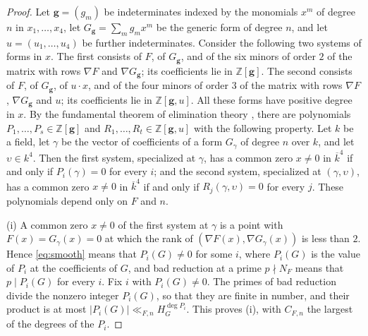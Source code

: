 \documentclass[11pt]{amsart}
\numberwithin{equation}{section}
\numberwithin{figure}{section}
\theoremstyle{definition}
\newcommand{\Z}{\mathbb{Z}}
\newcommand{\abs}[1]{\lvert #1\rvert}
\begin{document}
\begin{proof}
Let $\mathbf g=(g_m)$ be indeterminates indexed by the monomials
$x^m$ of degree $n$ in $x_1,\ldots,x_4$, let
$G_{\mathbf g}=\sum_mg_mx^m$ be the generic form of degree $n$, and
let $u=(u_1,\ldots,u_4)$ be further indeterminates. Consider the
following two systems of forms in $x$. The first consists of $F$,
of $G_{\mathbf g}$, and of the six minors of order $2$ of the matrix
with rows $\nabla F$ and $\nabla G_{\mathbf g}$; its coefficients lie
in $\Z[\mathbf g]$. The second consists of $F$, of $G_{\mathbf g}$,
of $u\cdot x$, and of the four minors of order $3$ of the matrix with
rows $\nabla F$, $\nabla G_{\mathbf g}$ and $u$; its coefficients lie
in $\Z[\mathbf g,u]$. All these forms have positive degree in $x$. By
the fundamental theorem of elimination theory \cite[Chapter~IX,
Theorems~3.2 and~4.1]{La}, there are polynomials
$P_1,\ldots,P_s\in\Z[\mathbf g]$ and
$R_1,\ldots,R_t\in\Z[\mathbf g,u]$ with the following property. Let
$k$ be a field, let $\gamma$ be the vector of coefficients of a form
$G_\gamma$ of degree $n$ over $k$, and let $\upsilon\in k^4$. Then
the first system, specialized at $\gamma$, has a common zero
$x\ne0$ in $\overline k^4$ if and only if $P_i(\gamma)=0$ for every
$i$; and the second system, specialized at $(\gamma,\upsilon)$, has a
common zero $x\ne0$ in $\overline k^4$ if and only if
$R_j(\gamma,\upsilon)=0$ for every $j$. These polynomials depend only
on $F$ and $n$.

(i) A common zero $x\ne0$ of the first system at $\gamma$ is a point
with $F(x)=G_\gamma(x)=0$ at which the rank of
$(\nabla F(x),\nabla G_\gamma(x))$ is less than $2$. Hence
\eqref{eq:smooth} means that $P_i(G)\ne0$ for some $i$, where
$P_i(G)$ is the value of $P_i$ at the coefficients of $G$, and bad
reduction at a prime $p\nmid N_F$ means that $p\mid P_i(G)$ for every
$i$. Fix $i$ with $P_i(G)\ne0$. The primes of bad reduction divide
the nonzero integer $P_i(G)$, so that they are finite in number, and
their product is at most $\abs{P_i(G)}\ll_{F,n}H_G^{\deg P_i}$. This
proves (i), with $C_{F,n}$ the largest of the degrees of the $P_i$.


\end{proof}
\end{document}
